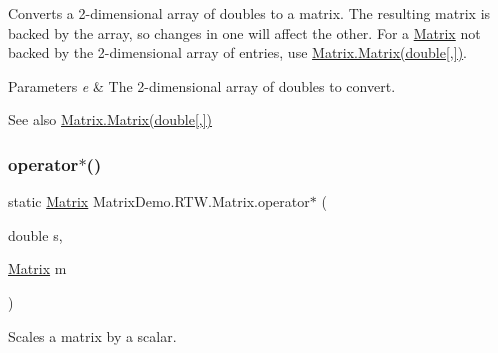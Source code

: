 Converts a 2-\/dimensional array of doubles to a matrix. The resulting matrix is backed by the array, so changes in one will affect the other. For a \mbox{\hyperlink{class_matrix_demo_1_1_r_t_w_1_1_matrix}{Matrix}} not backed by the 2-\/dimensional array of entries, use \mbox{\hyperlink{class_matrix_demo_1_1_r_t_w_1_1_matrix_ad2a320fd0c86551f34070679fd43433c}{Matrix.\+Matrix(double\mbox{[},\mbox{]})}}. 


\begin{DoxyParams}{Parameters}
{\em e} & The 2-\/dimensional array of doubles to convert.\\
\hline
\end{DoxyParams}
\begin{DoxySeeAlso}{See also}
\mbox{\hyperlink{class_matrix_demo_1_1_r_t_w_1_1_matrix_ad2a320fd0c86551f34070679fd43433c}{Matrix.\+Matrix(double\mbox{[},\mbox{]})}}


\end{DoxySeeAlso}
\mbox{\label{class_matrix_demo_1_1_r_t_w_1_1_matrix_ae315e38f4441e1df65dd5226b55314ea}} 
\subsubsection{\texorpdfstring{operator$\ast$()}{operator*()}\hspace{0.1cm}{\footnotesize\ttfamily [1/2]}}
{\footnotesize\ttfamily static \mbox{\hyperlink{class_matrix_demo_1_1_r_t_w_1_1_matrix}{Matrix}} Matrix\+Demo.\+R\+T\+W.\+Matrix.\+operator$\ast$ (\begin{DoxyParamCaption}\item[{double}]{s,  }\item[{\mbox{\hyperlink{class_matrix_demo_1_1_r_t_w_1_1_matrix}{Matrix}}}]{m }\end{DoxyParamCaption})\hspace{0.3cm}{\ttfamily [static]}}



Scales a matrix by a scalar. 


